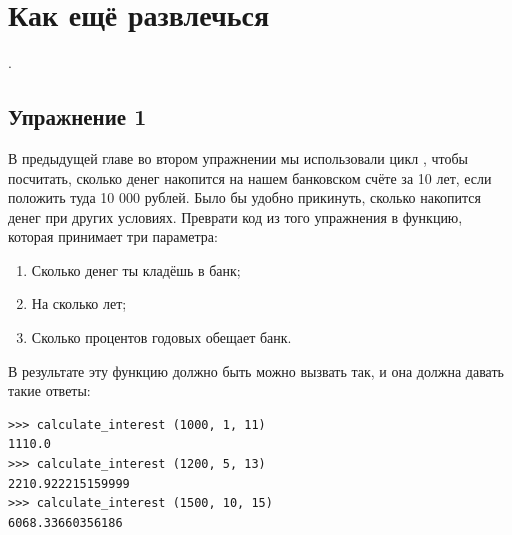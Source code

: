 
\vspace{6pt}

\section{Как ещё развлечься}

.

\subsection*{Упражнение 1}
В предыдущей главе во втором упражнении мы использовали цикл , чтобы посчитать, сколько денег накопится на нашем банковском счёте за 10 лет, если положить туда 10 000 рублей. Было бы удобно прикинуть, сколько накопится денег при других условиях. Преврати код из того упражнения в функцию, которая принимает три параметра:

\begin{enumerate}
\item Сколько денег ты кладёшь в банк;
\item На сколько лет;
\item Сколько процентов годовых обещает банк.
\end{enumerate}

В результате эту функцию должно быть можно вызвать так, и она должна давать такие ответы:

\begin{listing}
\begin{verbatim}
>>> calculate_interest (1000, 1, 11)
1110.0
>>> calculate_interest (1200, 5, 13)
2210.922215159999
>>> calculate_interest (1500, 10, 15)
6068.33660356186
\end{verbatim}
\end{listing}

